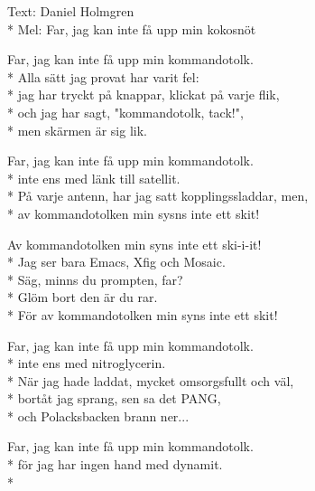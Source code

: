 \begin{SongText}[Kommandotolken]
    \begin{SongInfo}
        Text: Daniel Holmgren\\*%
        Mel: Far, jag kan inte få upp min kokosnöt
    \end{SongInfo}
    \begin{SongVerse}
        Far, jag kan inte få upp min kommandotolk.\\*%
        Alla sätt jag provat har varit fel:\\*%
        jag har tryckt på knappar, klickat på varje flik,\\*%
        och jag har sagt, "kommandotolk, tack!",\\*%
        men skärmen är sig lik.
    \end{SongVerse}
    \begin{SongVerse}
        Far, jag kan inte få upp min kommandotolk.\\*%
        inte ens med länk till satellit.\\*%
        På varje antenn, har jag satt kopplingssladdar, men,\\*%
        av kommandotolken min sysns inte ett skit!
    \end{SongVerse}
    \begin{SongVerse}
        Av kommandotolken min syns inte ett ski-i-it!\\*%
        Jag ser bara Emacs, Xfig och Mosaic.\\*%
        Säg, minns du prompten, far?\\*%
        Glöm bort den är du rar.\\*%
        För av kommandotolken min syns inte ett skit!
    \end{SongVerse}
    \begin{SongVerse}
        Far, jag kan inte få upp min kommandotolk.\\*%
        inte ens med nitroglycerin.\\*%
        När jag hade laddat, mycket omsorgsfullt och väl,\\*%
        bortåt jag sprang, sen sa det PANG,\\*%
        och Polacksbacken brann ner...
    \end{SongVerse}
    \begin{SongVerse}
        Far, jag kan inte få upp min kommandotolk.\\*%
        för jag har ingen hand med dynamit.\\*%

\end{SongVerse}
\end{SongText}
